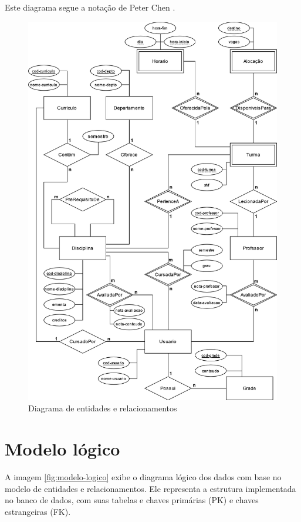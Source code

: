 Este diagrama segue a notação de Peter Chen \cite{peter-chen}. 

\begin{figure}[ht!]
    \begin{center}
    \includegraphics[width=390pt]{figuras/diagrama-er-chen.png}
    \caption{Diagrama de entidades e relacionamentos}
    \label{fig:diagrama-classes}
    \end{center}
\end{figure}

\section{Modelo lógico}

A imagem \ref{fig:modelo-logico} exibe o diagrama lógico dos dados com base no modelo de entidades e relacionamentos. Ele representa a estrutura implementada no banco de dados, com suas tabelas e chaves primárias (PK) e chaves estrangeiras (FK).

